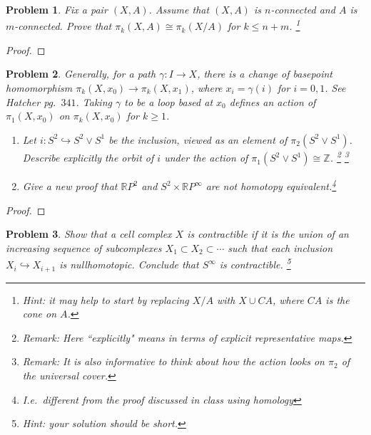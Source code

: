 \documentclass[11pt]{article}
\newtheorem{problem}{Problem}
\begin{document}
\pagebreak 


\begin{problem}
Fix a pair $(X,A)$. Assume that $(X,A)$ is $n$-connected and $A$ is $m$-connected. Prove that $\pi_k(X,A)\cong\pi_k(X/A)$ for $k\le n+m$. \footnote{Hint: it may help to start by replacing $X/A$ with $X\cup CA$, where $CA$ is the cone on $A$.} 
\end{problem}

\begin{proof}

\end{proof}

\pagebreak 





\begin{problem}
Generally, for a path $\gamma:I\to X$, there is a change of basepoint homomorphism $\pi_k(X,x_0)\to \pi_k(X,x_1)$, where $x_i=\gamma(i)$ for $i=0,1$. See Hatcher pg.\ $341$. Taking $\gamma$ to be a loop based at $x_0$ defines an action of $\pi_1(X,x_0)$ on $\pi_k(X,x_0)$ for $k\ge1$. 
\begin{enumerate}
\item[(a)] Let $i:S^2\hookrightarrow S^2\vee S^1$ be the inclusion, viewed as an element of $\pi_2(S^2\vee S^1)$. Describe explicitly the orbit of $i$ under the action of $\pi_1(S^2\vee S^1)\cong\mathbb Z$. \footnote{Remark: Here ``explicitly" means in terms of explicit representative maps.} \footnote{Remark: It is also informative to think about how the action looks on $\pi_2$ of the universal cover.}
\item[(b)] Give a new proof that $\mathbb RP^2$ and $S^2\times \mathbb RP^\infty$ are not homotopy equivalent.\footnote{I.e.\ different from the proof discussed in class using homology} 
\end{enumerate} \end{problem}


\begin{proof}

\end{proof}



\pagebreak 


\begin{problem}
Show that a cell complex $X$ is contractible if it is the union of an increasing sequence of subcomplexes $X_1\subset X_2\subset \cdots$ such that each inclusion $X_i\hookrightarrow X_{i+1}$ is nullhomotopic. Conclude that $S^\infty$ is contractible. \footnote{Hint: your solution should be short.} 
\end{problem}
\end{document}
